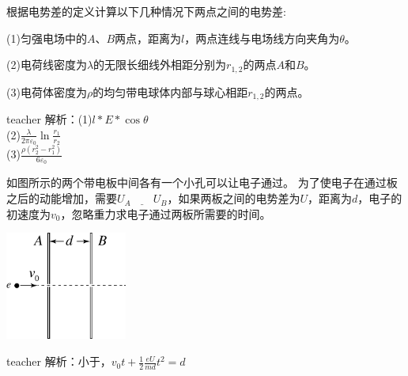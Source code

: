 \begin{example}
根据电势差的定义计算以下几种情况下两点之间的电势差:

(1)匀强电场中的$A$、$B$两点，距离为$l$，两点连线与电场线方向夹角为$\theta$。

(2)电荷线密度为$\lambda$的无限长细线外相距分别为$r_{1,2}$的两点$A$和$B$。

(3)电荷体密度为$ \rho$的均匀带电球体内部与球心相距$r_{1,2}$的两点。

\begin{taggedblock}{teacher}
\noindent
解析：(1)$l*E*\cos\theta$
\\(2)$\frac{\lambda}{2\pi\varepsilon_0}\ln{\frac{r_1}{r_2}}$
\\(3)$\frac{\rho(r_2^2-r_1^2)}{6\varepsilon_0}$
\end{taggedblock}
\end{example}

\begin{example}
如图所示的两个带电板中间各有一个小孔可以让电子通过。
为了使电子在通过板之后的动能增加，需要$U_A\underline{\qquad}U_B$，如果两板之间的电势差为$U$，距离为$d$，电子的初速度为$v_0$，忽略重力求电子通过两板所需要的时间。
\begin{flushright}
\includegraphics[width=0.3\textwidth]{images/elec-problem-6.pdf}
\end{flushright}
\begin{taggedblock}{teacher}
\noindent
解析：小于，$v_0t+\frac{1}{2}\frac{eU}{md}t^2=d$
\end{taggedblock}
\end{example}




